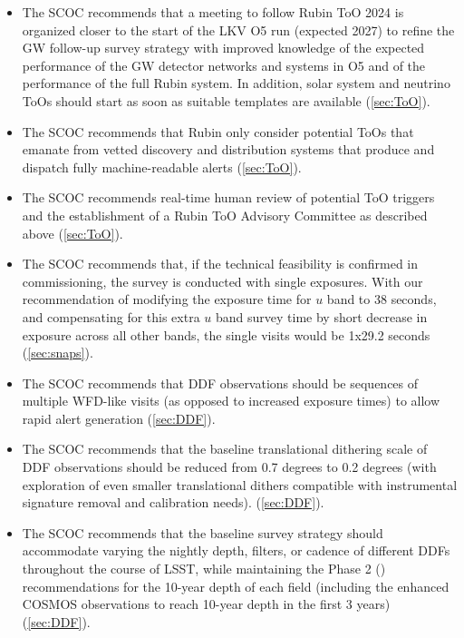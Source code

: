 \begin{itemize}
\item The SCOC recommends that a meeting to follow Rubin ToO 2024 is organized closer to the start of the LKV O5 run (expected 2027) to refine the GW follow-up survey strategy with improved knowledge of the expected performance of the GW detector networks and systems in O5 and of the performance of the full Rubin system. In addition, solar system and neutrino ToOs should start as soon as suitable templates are available (\autoref{sec:ToO}).

\item The SCOC recommends that Rubin only consider potential ToOs that emanate from vetted discovery and distribution systems that produce and dispatch fully machine-readable alerts (\autoref{sec:ToO}).

\item The SCOC recommends real-time human review of potential ToO triggers and the establishment of a Rubin ToO Advisory Committee as described above (\autoref{sec:ToO}).

\item The SCOC recommends that, if the technical feasibility is confirmed in commissioning, the survey is conducted with single exposures. With our recommendation of modifying the exposure time for $u$ band to 38 seconds, and compensating for this extra $u$ band survey time by short decrease in exposure across all other bands, the single visits would be 1x29.2 seconds (\autoref{sec:snaps}).

\item The SCOC recommends that DDF observations should be sequences of multiple WFD-like visits (as opposed to increased exposure times) to allow rapid alert generation (\autoref{sec:DDF}).

\item The SCOC recommends that the baseline translational dithering scale of DDF observations should be reduced from 0.7 degrees to 0.2 degrees (with exploration of even smaller translational dithers compatible with instrumental signature removal and calibration needs). (\autoref{sec:DDF}).

\item The SCOC recommends that the baseline survey strategy should accommodate varying the nightly depth, filters, or cadence of different DDFs throughout the course of LSST, while maintaining the Phase 2 () recommendations for the 10-year depth of each field (including the enhanced COSMOS observations to reach 10-year depth in the first 3 years) (\autoref{sec:DDF}).


\end{itemize}
